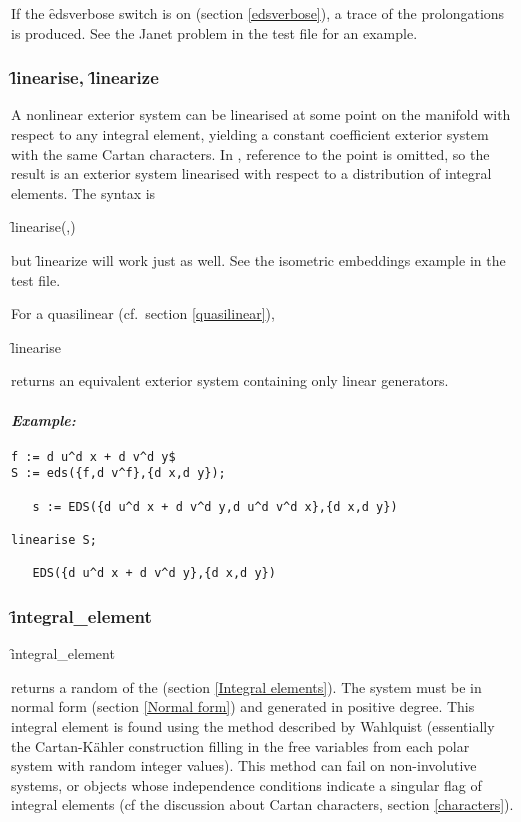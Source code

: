 If the \f{edsverbose} switch is on (section \ref{edsverbose}), a trace of
the prolongations is produced. See the Janet problem in the test file for
an example.

\subsubsection{\f{linearise}, \f{linearize}}
\label{linearise}

\hypertarget{operator:LINEARISE}{}
\hypertarget{operator:LINEARIZE}{}
A nonlinear exterior system can be linearised at some point on the
manifold with respect to any integral element, yielding a constant
coefficient exterior system with the same Cartan characters. In ,
reference to the point is omitted, so the result is an exterior system
linearised with respect to a distribution of integral elements. The syntax
is
\begin{syntax}
	\f{linearise}(,)
\end{syntax}
but \f{linearize} will work just as well. See the isometric embeddings
example in the test file.

For a quasilinear  (cf.~section \ref{quasilinear}),
\begin{syntax}
	\f{linearise} 
\end{syntax}
returns an equivalent exterior system containing only linear generators.

\paragraph{\textit{Example:}}
\begin{verbatim}
f := d u^d x + d v^d y$
S := eds({f,d v^f},{d x,d y});

   s := EDS({d u^d x + d v^d y,d u^d v^d x},{d x,d y})

linearise S;

   EDS({d u^d x + d v^d y},{d x,d y})
\end{verbatim}

\subsubsection{\f{integral\_element}}
\label{integral_element}

\hypertarget{operator:INTEGRAL_ELEMENT}{}
\begin{syntax}
	\f{integral\_element} 
\end{syntax}
returns a random  of the  (section
\ref{Integral elements}). The system must be in normal form (section
\ref{Normal form}) and generated in positive degree. This integral element
is found using the method described by Wahlquist \cite{Wahlquist:1993}
(essentially the Cartan-K{\"a}hler construction filling in the free variables
from each polar system with random integer values). This method can fail on
non-involutive systems, or  objects whose independence conditions
indicate a singular flag of integral elements (cf the discussion about
Cartan characters, section \ref{characters}).

